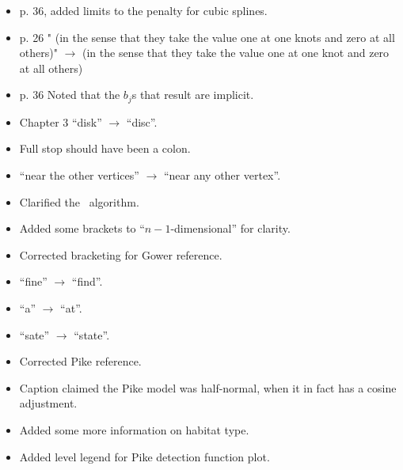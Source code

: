 \begin{itemize}
\item p. 36, added limits to the penalty for cubic splines.
\item p. 26 " (in the sense that they take the value one at one knots and zero at all others)" $\rightarrow$  (in the sense that they take the value one at one knot and zero at all others)
\item p. 36 Noted that the $b_j$s that result are implicit.
\item Chapter 3 ``disk'' $\rightarrow$ ``disc''.
\item {} Full stop should have been a colon.
\item {} ``near the other vertices'' $\rightarrow$ ``near any other vertex''.
\item {} Clarified the \sch\ algorithm.
\item {} Added some brackets to ``$n-1$-dimensional'' for clarity.
\item {} Corrected bracketing for Gower reference.
\item {} ``fine'' $\rightarrow$ ``find''.
\item {} ``a'' $\rightarrow$ ``at''.
\item {} ``sate'' $\rightarrow$ ``state''.
\item {} Corrected Pike reference.
\item {} Caption claimed the Pike model was half-normal, when it in fact has a cosine adjustment.
\item {} Added some more information on habitat type.
\item {} Added level legend for Pike detection function plot.
\end{itemize}

